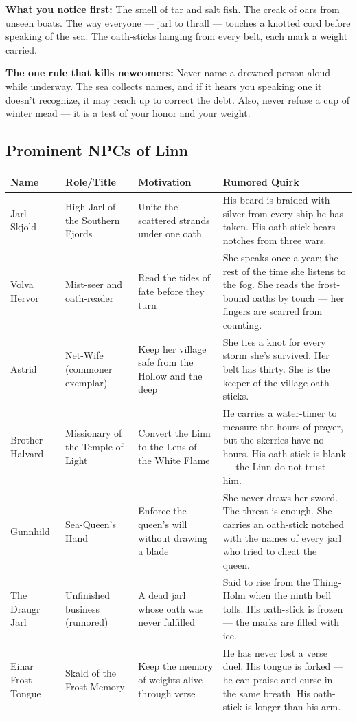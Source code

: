 \textbf{What you notice first:} The smell of tar and salt fish. The creak of oars from unseen boats. The way everyone --- jarl to thrall --- touches a knotted cord before speaking of the sea. The oath-sticks hanging from every belt, each mark a weight carried.

\textbf{The one rule that kills newcomers:} Never name a drowned person aloud while underway. The sea collects names, and if it hears you speaking one it doesn't recognize, it may reach up to correct the debt. Also, never refuse a cup of winter mead --- it is a test of your honor and your weight.

\subsection*{Prominent NPCs of Linn}
\label{sec:linn-npcs}

\begin{longtable}{|p{}|p{}|p{}|p{}|}
\hline
\textbf{Name} & \textbf{Role/Title} & \textbf{Motivation} & \textbf{Rumored Quirk} \\
\hline
Jarl Skjold & High Jarl of the Southern Fjords & Unite the scattered strands under one oath & His beard is braided with silver from every ship he has taken. His oath-stick bears notches from three wars. \\
\hline
Volva Hervor & Mist-seer and oath-reader & Read the tides of fate before they turn & She speaks once a year; the rest of the time she listens to the fog. She reads the frost-bound oaths by touch --- her fingers are scarred from counting. \\
\hline
Astrid & Net-Wife (commoner exemplar) & Keep her village safe from the Hollow and the deep & She ties a knot for every storm she's survived. Her belt has thirty. She is the keeper of the village oath-sticks. \\
\hline
Brother Halvard & Missionary of the Temple of Light & Convert the Linn to the Lens of the White Flame & He carries a water-timer to measure the hours of prayer, but the skerries have no hours. His oath-stick is blank --- the Linn do not trust him. \\
\hline
Gunnhild & Sea-Queen's Hand & Enforce the queen's will without drawing a blade & She never draws her sword. The threat is enough. She carries an oath-stick notched with the names of every jarl who tried to cheat the queen. \\
\hline
The Draugr Jarl & Unfinished business (rumored) & A dead jarl whose oath was never fulfilled & Said to rise from the Thing-Holm when the ninth bell tolls. His oath-stick is frozen --- the marks are filled with ice. \\
\hline
Einar Frost-Tongue & Skald of the Frost Memory & Keep the memory of weights alive through verse & He has never lost a verse duel. His tongue is forked --- he can praise and curse in the same breath. His oath-stick is longer than his arm. \\
\hline
\end{longtable}

